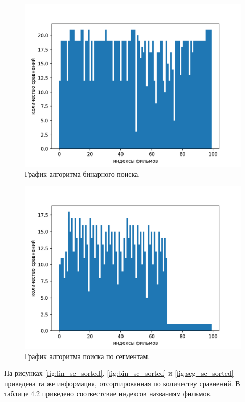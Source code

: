 \documentclass[12pt]{report}
\begin{document}
		\begin{figure}[H]
		\centering
		\includegraphics[scale=0.7]{bin.png}
		\caption{График алгоритма бинарного поиска.}
		\label{fig:bin_sc}
	\end{figure}
	
		\begin{figure}[H]
		\centering
		\includegraphics[scale=0.7]{seg.png}
		\caption{График алгоритма поиска по сегментам.}
		\label{fig:seg_sc}
	\end{figure}
	
На рисунках \ref{fig:lin_sc_sorted}, \ref{fig:bin_sc_sorted} и \ref{fig:seg_sc_sorted} приведена та же информация, отсортированная по количеству сравнений. В таблице 4.2 приведено соотвестсвие индексов названиям фильмов.
	
\end{document}
